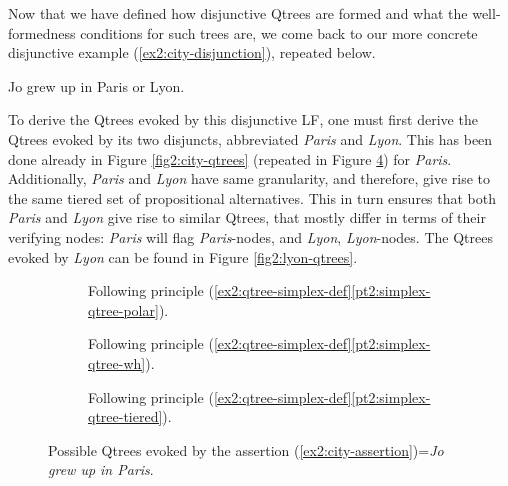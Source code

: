 Now that we have defined how disjunctive Qtrees are formed and what the well-formedness conditions for such trees are, we come back to our more concrete disjunctive example (\ref{ex2:city-disjunction}), repeated below. 

\begin{exe}
		 {Jo grew up in Paris or Lyon.}
\end{exe}

To derive the Qtrees evoked by this disjunctive LF, one must first derive the Qtrees evoked by its two disjuncts, abbreviated \textit{Paris} and \textit{Lyon}. This has been done already in Figure \ref{fig2:city-qtrees} (repeated in Figure \ref{fig2:paris-qtrees}) for \textit{Paris}. Additionally, \textit{Paris} and \textit{Lyon} have same granularity, and therefore, give rise to the same tiered set of propositional alternatives. This in turn ensures that both \textit{Paris} and \textit{Lyon} give rise to similar Qtrees, that mostly differ in terms of their verifying nodes: \textit{Paris} will flag \textit{Paris}-nodes, and \textit{Lyon}, \textit{Lyon}-nodes. The Qtrees evoked by \textit{Lyon} can be found in Figure \ref{fig2:lyon-qtrees}.

\begin{figure}[H]
	\centering
	\begin{subfigure}[t]{.23\linewidth}
		\centering
		\caption{Following principle (\ref{ex2:qtree-simplex-def}\ref{pt2:simplex-qtree-polar}).}\label{fig2:paris-qtree-polar}
	\end{subfigure}
	\hfill
	\begin{subfigure}[t]{.33\linewidth}
		\centering		{}
		\caption{Following principle (\ref{ex2:qtree-simplex-def}\ref{pt2:simplex-qtree-wh}).}\label{fig2:paris-qtree-wh}
	\end{subfigure}
	\hfill
	\begin{subfigure}[t]{.38\linewidth}
		\centering{}
		\caption{Following principle (\ref{ex2:qtree-simplex-def}\ref{pt2:simplex-qtree-tiered}).}\label{fig2:paris-qtree-tiered}
	\end{subfigure}
	\caption{Possible Qtrees evoked by the assertion (\ref{ex2:city-assertion})=\textit{Jo grew up in Paris}.}\label{fig2:paris-qtrees}
\end{figure}

